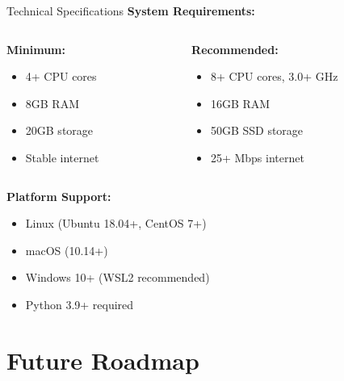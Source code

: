\documentclass[aspectratio=169]{beamer}
\begin{document}
\begin{frame}{Technical Specifications}
\textbf{System Requirements:}
\begin{columns}
\begin{column}{0.5\textwidth}
\textbf{Minimum:}
\begin{itemize}
\item 4+ CPU cores
\item 8GB RAM
\item 20GB storage
\item Stable internet
\end{itemize}
\end{column}
\begin{column}{0.5\textwidth}
\textbf{Recommended:}
\begin{itemize}
\item 8+ CPU cores, 3.0+ GHz
\item 16GB RAM
\item 50GB SSD storage
\item 25+ Mbps internet
\end{itemize}
\end{column}
\end{columns}

\vspace{0.5cm}
\textbf{Platform Support:}
\begin{itemize}
\item Linux (Ubuntu 18.04+, CentOS 7+)
\item macOS (10.14+)
\item Windows 10+ (WSL2 recommended)
\item Python 3.9+ required
\end{itemize}
\end{frame}

\section{Future Roadmap}
\end{document}

